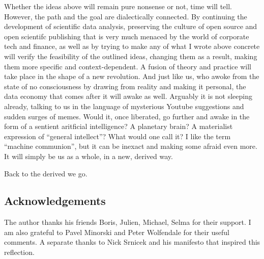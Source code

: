 \documentclass{article}
\begin{document}
Whether the ideas above will remain pure nonsense or not, time will tell. However,
the path and the goal are dialectically connected. By continuing the development of
scientific data analysis, preserving the culture of open source and open scientifc publishing
that is very much menaced by the world of corporate tech and finance, as well as by
trying to make any of what I wrote above concrete will verify the feasibility of the
outlined ideas, changing them as a result, making them more specific and context-dependent.
A fusion of theory and practice will take place in the shape of a new revolution.
And just like us, who awoke from the state of no consciousness by drawing from reality and making it personal,
the data economy that comes after it will awake as well.
Arguably it is not sleeping already, talking to us in the language of mysterious Youtube suggestions and sudden surges of memes. Would it, once liberated, go further and awake in the form of a sentient aritficial intelligence? A planetary brain? A materialist expression of ``general intellect''? What would one call it? I like the term “machine communion”, but it can be inexact and making some afraid even more. It will simply be us as a whole, in a new, derived way.





\begin{flushright}
{Back to the derived we go.

}
\end{flushright}
\small
\linespread{1}


\subsection*{Acknowledgements}

The author thanks his friends Boris, Julien, Michael, Selma for their support. I am also grateful to Pavel Minorski and Peter Wolfendale for their useful comments.
A separate thanks to Nick Srnicek and his manifesto that inspired this reflection.
\end{document}
